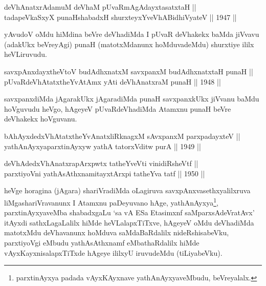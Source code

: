
\begin{shl}
deVhAnatxrAdamuM deVhaM pUvaRmAgAdayxtasatxtaH || \\
tadapeVkaSxyX punaHshabadxH shurxteyxYveVhABidhiVyateV \hfill || 1947 ||
  
\end{shl}

\begin{artha}
yAvudoV oMdu hiMdina beVre deVhadiMda I pUvaR deVhakekx baMda jiVvavu (adakUkx beVreyAgi) punaH (matotxMdanunx hoMduvadeMdu) shurxtiye ililx heVLiruvudu.
\end{artha}


\begin{shl}
savxpAnxdayxtheVtoV budAdhxnatxM savxpanxM budAdhxnatxtaH punaH || \\
pUvaRdeVhAtatxtheYvA\s \s tAmx yAti deVhAnatxraM punaH \hfill || 1948 ||
  
\end{shl}

\begin{artha}
savxpanxdiMda jAgarakUkx jAgaradiMda punaH savxpanxkUkx jiVvanu baMdu
hoVguvudu heVgo, hAgeyeV pUvaRdeVhadiMda Atamxnu punaH beVre deVhakekx
hoVguvanu.
\end{artha}


\begin{shl}
bAhAyxdedxVhAtatxtheYvAnatxliRknagxM sAvxpanxM parxpadayxteV || \\
yathAnAyxyaparxtinAyxyw yathA tatorxVditw purA \hfill || 1949 ||
  
\end{shl}

\begin{shl}
deVhAdedxVhAnatxrapArxpwtx tatheYveVti vinidiRsheVtf ||  \\
parxtiyoVni yathAsAthxnamitayxtArxpi tatheYva tatf \hfill || 1950 ||
  
\end{shl}

\begin{artha}
heVge horagina (jAgara) shariVradiMda oLagiruva
savxpAnxvasethxyalilxruva liMgashariVravanunx I Atamxnu paDeyuvano
hAge, yathAnAyxya\footnote{parxtinAyxya padada vAyxKAyxnave
yathAnAyxyaveMbudu, beVreyalalx.}, parxtinAyxyaveMba shabadxgaLu
`sa vA ESa Etasimxnf saMparxsAdeVratAvx' itAyxdi sathxLagaLalilx hiMde heVLalapxTiTxve, hAgeyeV oMdu
deVhadiMda matotxMdu deVhavanunx hoMduva saMdaBaRdalilx
nideRshisabeVku, parxtiyoVgi eMbudu yathAsAthxnamf eMbathaRdalilx
hiMde vAyxKayxnisalapxTiTxde hAgeye ililxyU iruvudeMdu (tiLiyabeVku).
\end{artha}


